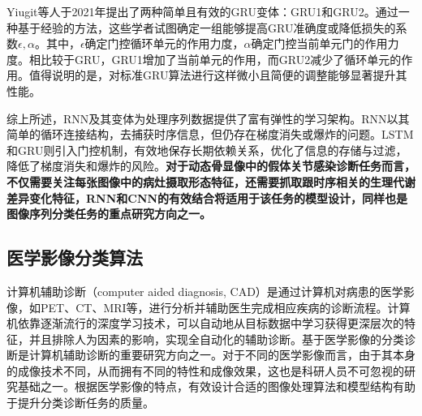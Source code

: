 Yiugit等人\cite{yiugit2021simple}于2021年提出了两种简单且有效的GRU变体：GRU1和GRU2。通过一种基于经验的方法，这些学者试图确定一组能够提高GRU准确度或降低损失的系数\(\epsilon,\alpha\)。其中，\(\epsilon\)确定门控循环单元的作用力度，\(\alpha\)确定门控当前单元门的作用力度。相比较于GRU，GRU1增加了当前单元的作用，而GRU2减少了循环单元的作用。值得说明的是，对标准GRU算法进行这样微小且简便的调整能够显著提升其性能。

综上所述，RNN及其变体为处理序列数据提供了富有弹性的学习架构。RNN以其简单的循环连接结构，去捕获时序信息，但仍存在梯度消失或爆炸的问题。LSTM和GRU则引入门控机制，有效地保存长期依赖关系，优化了信息的存储与过滤，降低了梯度消失和爆炸的风险。\textbf{对于动态骨显像中的假体关节感染诊断任务而言，不仅需要关注每张图像中的病灶摄取形态特征，还需要抓取跟时序相关的生理代谢差异变化特征，RNN和CNN的有效结合将适用于该任务的模型设计，同样也是图像序列分类任务的重点研究方向之一。}

\subsection{医学影像分类算法}

计算机辅助诊断（computer aided diagnosis, CAD）是通过计算机对病患的医学影像，如PET、CT、MRI等，进行分析并辅助医生完成相应疾病的诊断流程。计算机依靠逐渐流行的深度学习技术，可以自动地从目标数据中学习获得更深层次的特征，并且排除人为因素的影响，实现全自动化的辅助诊断。基于医学影像的分类诊断是计算机辅助诊断的重要研究方向之一。对于不同的医学影像而言，由于其本身的成像技术不同，从而拥有不同的特性和成像效果，这也是科研人员不可忽视的研究基础之一。根据医学影像的特点，有效设计合适的图像处理算法和模型结构有助于提升分类诊断任务的质量。

